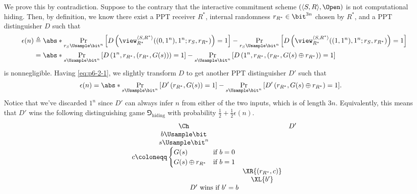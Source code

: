 \begin{answer}[b]
    We prove this by contradiction. Suppose to the contrary that the interactive commitment scheme $(\langle S, R\rangle, \Open)$ is not computational hiding. Then, by definition, we know there exist a PPT receiver $R^\ast$, internal randomness $r_{R^\ast}\in\bit^{3n}$ chosen by $R^\ast$, and a PPT distinguisher $D$ such that
    \begin{align}
        \epsilon(n)&\triangleq
        \abs*{\Pr_{r_S\Usample\bit^n}\left[D\left(\view^{\langle S, R^\ast \rangle}_{R^\ast}((0,1^n),1^n;r_S, r_{R^\ast})\right)=1 \right]
        -\Pr_{r_S\Usample\bit^n}\left[D\left(\view^{\langle S, R^\ast \rangle}_{R^\ast}((1,1^n),1^n;r_S, r_{R^\ast})\right)=1 \right]} \notag\\
        &= \abs*{\Pr_{s \Usample\bit^n}\left[D\left(1^n, r_{R^\ast}, (r_{R^\ast}, G(s))\right)=1 \right]
        -\Pr_{s \Usample\bit^n}\left[D\left(1^n, r_{R^\ast}, (r_{R^\ast}, G(s) \oplus r_{R^\ast})\right)=1 \right]} \label{eq:p6-2-1}
    \end{align}
    is nonnegligible. Having \eqref{eq:p6-2-1}, we slightly transform $D$ to get another PPT distinguisher $D'$ such that
    \begin{align}
        \epsilon(n)&=
        \abs*{\Pr_{s \Usample\bit^n}\left[D'\left(r_{R^\ast}, G(s)\right)=1 \right]
        -\Pr_{s \Usample\bit^n}\left[D'\left(r_{R^\ast}, G(s) \oplus r_{R^\ast}\right)=1 \right]}.
    \end{align}
    Notice that we've discarded $1^n$ since $D'$ can always infer $n$ from either of the two inputs, which is of length $3n$. Equivalently, this means that $D'$ wins the following distinguishing game $\Game_{\textrm{hiding}}$ with probability $\frac{1}{2}+\frac{1}{2}\epsilon(n)$.
    {
        \[
            \begin{array}{@{} c c c @{}}
            \Ch & & D' \\
            b \Usample \bit & & \\
            s \Usample \bit^n & & \\
            c\coloneqq \begin{cases} 
                G(s) &\textrm{if } b = 0 \\
                G(s)\oplus r_{R^\ast} &\textrm{if }b = 1 
            \end{cases} & & \\
            & \XR{(r_{R^\ast}, c)} & \\
            & \XL{b'} & \\
            \multicolumn{3}{c}{\text{$D'$ wins if $b' = b$}}
        \end{array}
        \]
        \label{fig:p6-game1}
    }


\end{answer}
